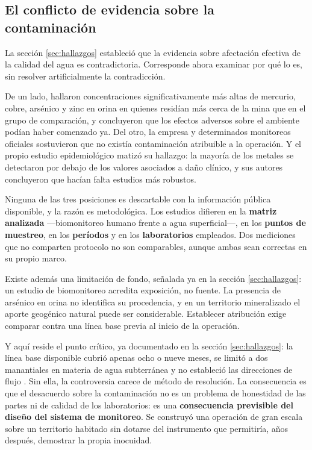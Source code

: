 \subsection{El conflicto de evidencia sobre la contaminación}

La sección \ref{sec:hallazgos} estableció que la evidencia sobre afectación
efectiva de la calidad del agua es contradictoria. Corresponde ahora examinar por
qué lo es, sin resolver artificialmente la contradicción.

De un lado, \textcite{basu2010scitotenv} hallaron concentraciones
significativamente más altas de mercurio, cobre, arsénico y zinc en orina en
quienes residían más cerca de la mina que en el grupo de comparación, y
\textcite{etech2010water} concluyeron que los efectos adversos sobre el ambiente
podían haber comenzado ya. Del otro, la empresa y determinados monitoreos
oficiales sostuvieron que no existía contaminación atribuible a la operación. Y
el propio estudio epidemiológico matizó su hallazgo: la mayoría de los metales
se detectaron por debajo de los valores asociados a daño clínico, y sus autores
concluyeron que hacían falta estudios más robustos.

Ninguna de las tres posiciones es descartable con la información pública
disponible, y la razón es metodológica. Los estudios difieren en la
\textbf{matriz analizada} —biomonitoreo humano frente a agua superficial—, en los
\textbf{puntos de muestreo}, en los \textbf{períodos} y en los
\textbf{laboratorios} empleados. Dos mediciones que no comparten protocolo no son
comparables, aunque ambas sean correctas en su propio marco.

Existe además una limitación de fondo, señalada ya en la sección
\ref{sec:hallazgos}: un estudio de biomonitoreo acredita exposición, no fuente.
La presencia de arsénico en orina no identifica su procedencia, y en un territorio
mineralizado el aporte geogénico natural puede ser considerable. Establecer
atribución exige comparar contra una línea base previa al inicio de la operación.

Y aquí reside el punto crítico, ya documentado en la sección
\ref{sec:hallazgos}: la línea base disponible cubrió apenas ocho o nueve meses,
se limitó a dos manantiales en materia de agua subterránea y no estableció las
direcciones de flujo \parencite{etech2010water}. Sin ella, la controversia carece de
método de resolución. La consecuencia es que el desacuerdo sobre la contaminación
no es un problema de honestidad de las partes ni de calidad de los laboratorios:
es una \textbf{consecuencia previsible del diseño del sistema de monitoreo}. Se
construyó una operación de gran escala sobre un territorio habitado sin dotarse
del instrumento que permitiría, años después, demostrar la propia inocuidad.

